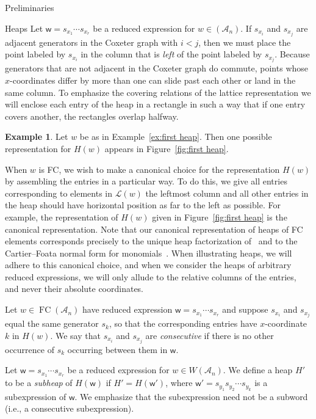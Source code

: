 \documentclass[11pt]{amsart}
\theoremstyle{definition}
\newtheorem{example}[theorem]{Example}
\numberwithin{equation}{section}
\newcommand{\A}{\mathcal{A}}
\renewcommand{\L}{\mathcal{L}}
\renewcommand{\(}{\left(}
\renewcommand{\)}{\right)}
\newcommand{\w}{\mathsf{w}}
\DeclareMathOperator{\FC}{FC}
\begin{document}
\begin{section}{Preliminaries}
\begin{subsection}{Heaps}
Let $\w=s_{x_1}\cdots s_{x_r}$ be a reduced expression for $w \in (\A_{n})$.  If $s_{x_i}$ and $s_{x_j}$ are adjacent generators in the Coxeter graph with $i<j$, then we must place the point labeled by $s_{x_i}$ in the column that is \emph{left} of the point labeled by $s_{x_j}$.  Because generators that are not adjacent in the Coxeter graph do commute, points whose $x$-coordinates differ by more than one can slide past each other or land in the same column.  To emphasize the covering relations of the lattice representation we will enclose each entry of the heap in a rectangle in such a way that if one entry covers another, the rectangles overlap halfway.

\begin{example}\label{ex:second heap}
Let $w$ be as in Example~\ref{ex:first heap}.  Then one possible representation for $H(w)$ appears in Figure~\ref{fig:first heap}.
\end{example}

When $w$ is FC, we wish to make a canonical choice for the representation $H(w)$ by assembling the entries in a particular way.  To do this, we give all entries corresponding to elements in $\L(w)$ the leftmost column and all other entries in the heap should have horizontal position as far to the left as possible.  For example, the representation of $H(w)$ given in Figure~\ref{fig:first heap} is the canonical representation.  Note that our canonical representation of heaps of FC elements corresponds precisely to the unique heap factorization of~\cite[Lemma 2.9]{Viennot1986} and to the Cartier--Foata normal form for monomials~\cite{Cartier1969,Green2006a}.  When illustrating heaps, we will adhere to this canonical choice, and when we consider the heaps of arbitrary reduced expressions, we will only allude to the relative columns of the entries, and never their absolute coordinates.  

Let $w \in \FC(\A_n)$ have reduced expression $\w=s_{x_1}\cdots s_{x_r}$ and suppose $s_{x_i}$ and $s_{x_j}$ equal the same generator $s_k$, so that the corresponding entries have $x$-coordinate $k$ in $H(w)$.  We say that $s_{x_i}$ and $s_{x_j}$ are \emph{consecutive} if there is no other occurrence of $s_{k}$ occurring between them in $\w$.

Let $\w=s_{x_{1}} \cdots s_{x_{r}}$ be a reduced expression for $w \in W(\A_{n})$.  We define a heap $H'$ to be a \emph{subheap} of $H(\w)$ if $H'=H(\w')$, where $\w'=s_{y_1}s_{y_2} \cdots s_{y_k}$ is a subexpression of $\w$.  We emphasize that the subexpression need not be a subword (i.e., a consecutive subexpression).


\end{subsection}
\end{section}
\end{document}
